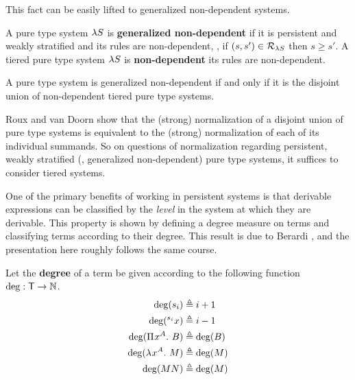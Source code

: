 \documentclass{article}
\begin{document}
This fact can be easily lifted to generalized non-dependent systems.

\begin{definition}
A pure type system $\lambda S$ is \textbf{generalized non-dependent} if it is persistent and weakly stratified and its rules are non-dependent, \ie, if $(s, s') \in \mathcal R_{\lambda S}$ then $s \geq s'$.
A tiered pure type system $\lambda S$ is \textbf{non-dependent} its rules are non-dependent.
\end{definition}

\begin{corollary}
A pure type system is generalized non-dependent if and only if it is the disjoint union of non-dependent tiered pure type systems.
\end{corollary}

Roux and van Doorn \cite{roux-doorn-2014} show that the (strong) normalization of a disjoint union of pure type systems is equivalent to the (strong) normalization of each of its individual summands.
So on questions of normalization regarding persistent, weakly stratified (\eg, generalized non-dependent) pure type systems, it suffices to consider tiered systems.

One of the primary benefits of working in persistent systems is that derivable expressions can be classified by the \textit{level} in the system at which they are derivable.
This property is shown by defining a degree measure on terms and classifying terms according to their degree.
This result is due to Berardi \cite{berardi-1990}, and the presentation here roughly follows the same course.

\begin{definition}
Let the \textbf{degree} of a term be given according to the following function $\deg : \mathsf{T} \to \mathbb N$.
\begin{align*}
    \deg(s_i) &\triangleq i + 1 \\
    \deg({}^{s_{i}}{x}) &\triangleq i - 1 \\
    \deg({\Pi^{} {x}^{A}. \ {B}}) &\triangleq \deg(B) \\
    \deg(\lambda^{} x^{A}. \ M) &\triangleq \deg(M) \\
    \deg(MN) &\triangleq \deg(M)
\end{align*}
\end{definition}
\end{document}
